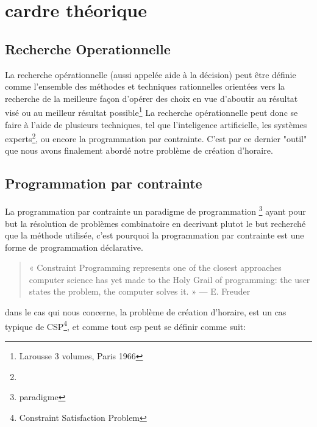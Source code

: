 \section{cardre théorique}
\subsection{Recherche Operationnelle}
La recherche opérationnelle (aussi appelée aide à la décision) peut être définie comme l'ensemble des méthodes et techniques rationnelles orientées vers la recherche de la meilleure façon d'opérer des choix en vue d'aboutir au résultat visé ou au meilleur résultat possible\footnote{Larousse 3 volumes, Paris 1966}
La recherche opérationnelle peut donc se faire à l'aide de plusieurs techniques, tel que l'inteligence artificielle, les systèmes experts\footnote{}, ou encore la programmation par contrainte.  C'est par ce dernier "outil" que nous avons finalement abordé notre problème de création d'horaire.
\subsection{Programmation par contrainte}

La programmation par contrainte un paradigme de programmation \footnote{paradigme} ayant pour but la résolution de problèmes combinatoire en
 decrivant plutot le but recherché que la méthode utilisée, c'est pourquoi la programmation par contrainte est une forme de programmation déclarative.
\begin{quote}
« Constraint Programming represents one of the closest approaches computer science has yet made to the Holy Grail of programming: the user states the problem, the computer solves it. »
— E. Freuder
\end{quote}

dans le cas qui nous concerne, la problème de création d'horaire, est un cas typique de CSP\footnote{Constraint Satisfaction Problem}, et comme tout csp peut se définir comme suit:
   
\begin{center}
\end{center}

